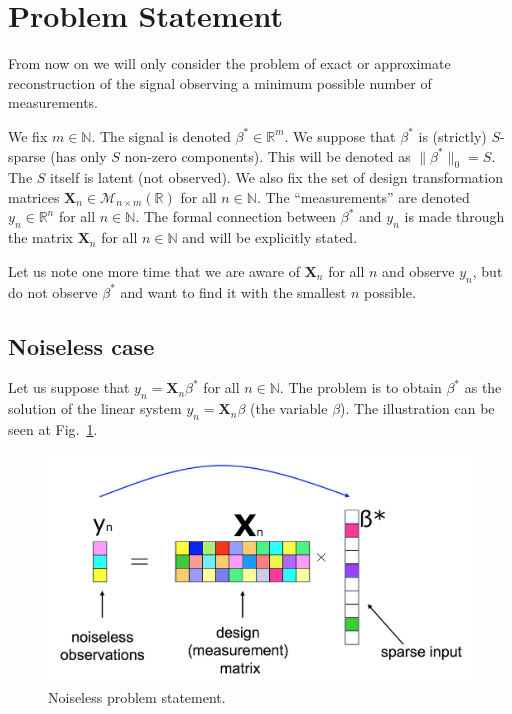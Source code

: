 \documentclass[11pt]{article}
\numberwithin{equation}{section}
\theoremstyle{definition}
\begin{document}
\section{Problem Statement}
From now on we will only consider the problem of exact or approximate reconstruction of the signal observing a minimum possible number of measurements.

We fix $m \in \mathbb N$. The signal is denoted $\beta^* \in \mathbb R^m$.
We suppose that $\beta^*$ is (strictly) $S$-sparse (has only $S$ non-zero components).
This will be denoted as $\|\beta^*\|_0 = S$.
The $S$ itself is latent (not observed).
We also fix the set of design transformation matrices $\mathbf X_n \in \mathcal M_{n \times m}(\mathbb R)$ for all $n \in \mathbb N$.
The ``measurements'' are denoted $y_n \in \mathbb R^n$ for all $n \in \mathbb N$.
The formal connection between $\beta^*$ and $y_n$ is made through the matrix $\mathbf X_n$ for all $n \in \mathbb N$ and will be explicitly stated.

Let us note one more time that we are aware of $\mathbf X_n$ for all $n$ and observe $y_n$, but do not observe $\beta^*$ and want to find it with the smallest $n$ possible.

\subsection{Noiseless case}
Let us suppose that $y_n = \mathbf X_n \beta^*$ for all $n \in \mathbb N$.
The problem is to obtain $\beta^*$ as the solution of the linear system $y_n = \mathbf X_n \beta$ (the variable $\beta$).
The illustration can be seen at Fig.~\ref{fig:NoiseLessProblemStatement}.
\begin{figure}[H]
    \begin{center}
        \includegraphics[width=.75\textwidth]{figures/problem_statement_2.pdf}
    \end{center}
    \caption{
        \label{fig:NoiseLessProblemStatement}
        Noiseless problem statement.
    }
\end{figure}
\end{document}
